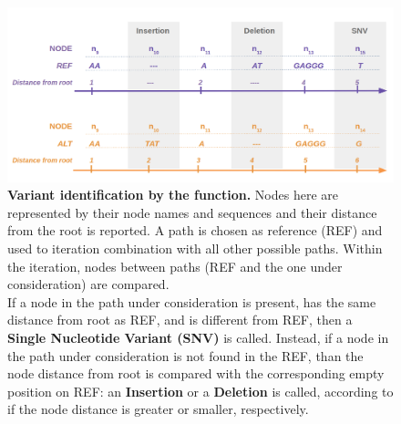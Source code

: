 
\begin{figure}[H]
\centering
\includegraphics[width=1.00 \textwidth]{fig/path_ref.png}
\decoRule
\caption{\textbf{Variant identification by the \bbc function.} Nodes here are represented by their node names and sequences and their distance from the root is reported. A path is chosen as reference (REF) and used to iteration combination with all other possible paths. Within the iteration, nodes between paths (REF and the one under consideration) are compared. \\If a node in the path under consideration is present, has the same distance from root as REF, and is different from REF, then a \textbf{Single Nucleotide Variant (SNV)} is called. Instead, if a node in the path under consideration is not found in the REF, than the node distance from root is compared with the corresponding empty position on REF: an \textbf{Insertion} or a \textbf{Deletion} is called, according to if the node distance is greater or smaller, respectively.}
\label{fig:path_ref.png}
\end{figure}






